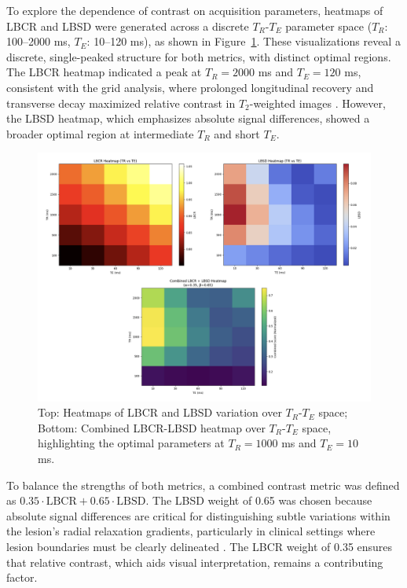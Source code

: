 \documentclass[10pt,a4paper,twoside]{article}
\begin{document}
To explore the dependence of contrast on acquisition parameters, heatmaps of LBCR and LBSD were generated across a discrete \( T_R \)-\( T_E \) parameter space (\( T_R \): 100–2000 ms, \( T_E \): 10–120 ms), as shown in Figure~\ref{fig:lbcrsurface}. These visualizations reveal a discrete, single-peaked structure for both metrics, with distinct optimal regions. The LBCR heatmap indicated a peak at \( T_R = 2000 \) ms and \( T_E = 120 \) ms, consistent with the grid analysis, where prolonged longitudinal recovery and transverse decay maximized relative contrast in \( T_2 \)-weighted images \cite{bernstein2004}. However, the LBSD heatmap, which emphasizes absolute signal differences, showed a broader optimal region at intermediate \( T_R \) and short \( T_E \).

\begin{figure}[htbp!]
\centering
\includegraphics[width=\textwidth]{figures/lbcrlbsdcombinedheatmaps.png}
\caption{Top: Heatmaps of LBCR and LBSD variation over \( T_R \)-\( T_E \) space; Bottom: Combined LBCR-LBSD heatmap over \( T_R \)-\( T_E \) space, highlighting the optimal parameters at \( T_R = 1000 \) ms and \( T_E = 10 \) ms.}
\label{fig:lbcrsurface}
\end{figure}

To balance the strengths of both metrics, a combined contrast metric was defined as \( 0.35 \cdot \text{LBCR} + 0.65 \cdot \text{LBSD} \). The LBSD weight of 0.65 was chosen because absolute signal differences are critical for distinguishing subtle variations within the lesion’s radial relaxation gradients, particularly in clinical settings where lesion boundaries must be clearly delineated \cite{does2002}. The LBCR weight of 0.35 ensures that relative contrast, which aids visual interpretation, remains a contributing factor. 
\end{document}
